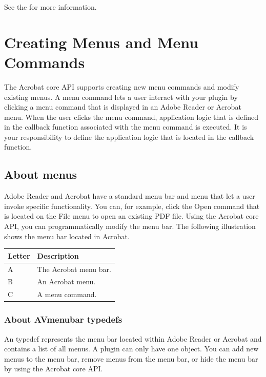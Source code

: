 \documentclass[letterpaper,12pt,english,openany,oneside]{sphinxmanual}
\begin{document}
See the  for more information.


\chapter{Creating Menus and Menu Commands}
\label{\detokenize{Plugins_Menu:creating-menus-and-menu-commands}}\label{\detokenize{Plugins_Menu::doc}}
The Acrobat core API supports creating new menu commands and modify existing menus. A menu command lets a user interact with your plugin by clicking a menu command that is displayed in an Adobe Reader or Acrobat menu. When the user clicks the menu command, application logic that is defined in the callback function associated with the menu command is executed. It is your responsibility to define the application logic that is located in the callback function.


\section{About menus}
\label{\detokenize{Plugins_Menu:about-menus}}
Adobe Reader and Acrobat have a standard menu bar and menu that let a user invoke specific functionality. You can, for example, click the Open command that is located on the File menu to open an existing PDF file. Using the Acrobat core API, you can programmatic\sphinxhyphen{}ally modify the menu bar. The following illustration shows the menu bar located in Acrobat.

\noindent{}


\begin{savenotes}\sphinxattablestart
\centering
\begin{tabulary}{\linewidth}[t]{|T|T|}
\hline
\sphinxstyletheadfamily 
Letter
&\sphinxstyletheadfamily 
Description
\\
\hline
A
&
The Acrobat menu bar.
\\
\hline
B
&
An Acrobat menu.
\\
\hline
C
&
A menu command.
\\
\hline
\end{tabulary}
\par
\sphinxattableend\end{savenotes}


\subsection{About AVmenubar typedefs}
\label{\detokenize{Plugins_Menu:about-avmenubar-typedefs}}
An  typedef represents the menu bar located within Adobe Reader or Acrobat and contains a list of all menus. A plugin can only have one  object. You can add new menus to the menu bar, remove menus from the menu bar, or hide the menu bar by using the Acrobat core API.
\end{document}
